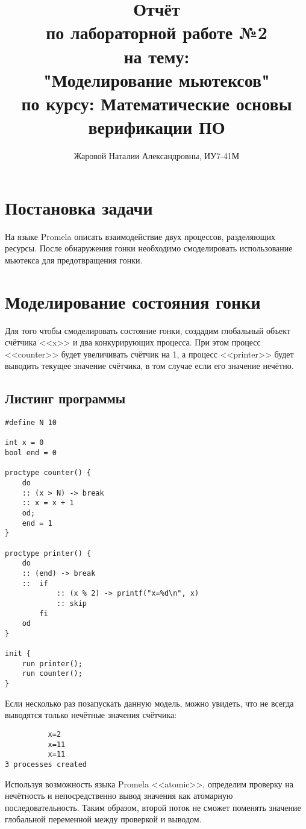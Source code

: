 \documentclass[a4paper,12pt]{report}
\title{Отчёт \\ по лабораторной работе №2 \\ на тему: \\ "Моделирование мьютексов" \\ по курсу: Математические основы верификации ПО}
\author{Жаровой Наталии Александровны, ИУ7-41М\\}
\begin{document}
\maketitle

\section*{Постановка задачи}

На языке Promela описать взаимодействие двух процессов, разделяющих ресурсы. После обнаружения гонки необходимо 
смоделировать использование мьютекса для предотвращения гонки.

\section*{Моделирование состояния гонки}
Для того чтобы смоделировать состояние гонки, создадим глобальный объект счётчика <<x>> и два
конкурирующих процесса. При этом процесс <<counter>> будет увеличивать счётчик на 1, а процесс <<printer>>
будет выводить текущее значение счётчика, в том случае если его значение нечётно.

\subsection*{Листинг программы}
\begin{Verbatim}
#define N 10

int x = 0
bool end = 0

proctype counter() {
    do
    :: (x > N) -> break
    :: x = x + 1
    od;
    end = 1
}

proctype printer() {
    do
    :: (end) -> break
    ::  if
            :: (x % 2) -> printf("x=%d\n", x)
            :: skip
        fi
    od
}

init {
    run printer();
    run counter();
}
\end{Verbatim}

Если несколько раз позапускать данную модель, можно увидеть, что не всегда выводятся только нечётные значения счётчика:
\begin{Verbatim}
          x=2
          x=11
          x=11
3 processes created
\end{Verbatim}

Используя возможность языка Promela <<atomic>>, определим проверку на нечётность и непосредственно вывод значения как атомарную последовательность.
Таким образом, второй поток не сможет поменять значение глобальной переменной между проверкой и выводом.
\end{document}
